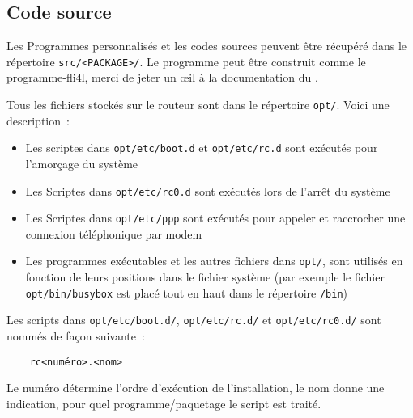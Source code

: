 \subsection{Code source}

    Les Programmes personnalisés et les codes sources peuvent être récupéré
    dans le répertoire \texttt{src/<PACKAGE>/}. Le programme peut
    être construit comme le programme-fli4l, merci de jeter un œil à la
    documentation du .



    Tous les fichiers stockés sur le routeur sont dans le répertoire
    \texttt{opt/}. Voici une description~:

    \begin{itemize}
    \item Les scriptes dans \texttt{opt/etc/boot.d} et \texttt{opt/etc/rc.d} sont exécutés pour
      l'amorçage du système
    \item Les Scriptes dans \texttt{opt/etc/rc0.d} sont exécutés lors de l'arrêt du système
    \item Les Scriptes dans \texttt{opt/etc/ppp} sont exécutés pour appeler et
      raccrocher une connexion téléphonique par modem
    \item Les programmes exécutables et les autres fichiers dans \texttt{opt/}, sont utilisés
	  en fonction de leurs positions dans le fichier système (par exemple le fichier
	  \texttt{opt/bin/busybox} est placé tout en haut dans le répertoire \texttt{/bin})
    \end{itemize}

    Les scripts dans \texttt{opt/etc/boot.d/}, \texttt{opt/etc/rc.d/} et \texttt{opt/etc/rc0.d/}
	sont nommés de façon suivante~:

    \begin{example}
    \begin{verbatim}
    rc<numéro>.<nom>
    \end{verbatim}
    \end{example}

    Le numéro détermine l'ordre d'exécution de l’installation, le nom donne
    une indication, pour quel programme/paquetage le script est traité.

